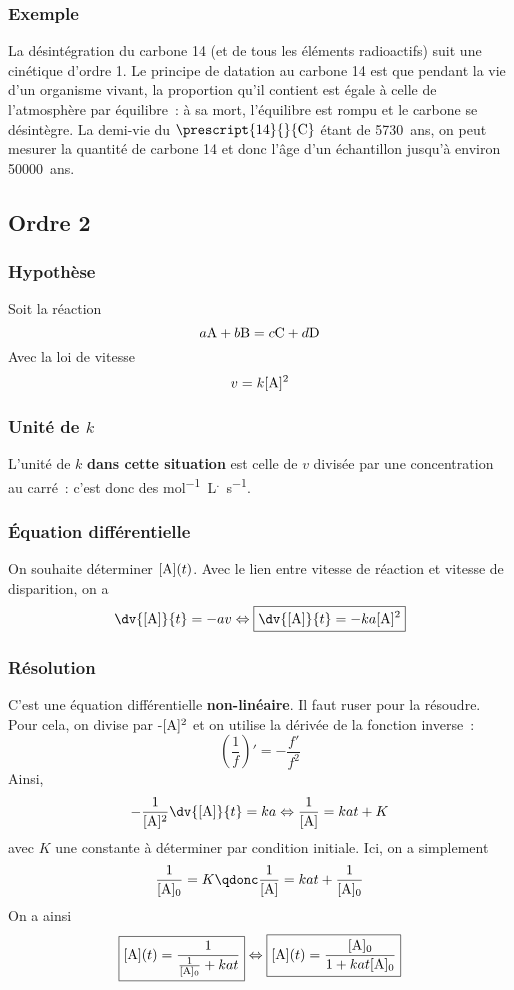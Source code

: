 \documentclass[../main/main.tex]{subfiles}
\begin{document}
\subsubsection{Exemple}
La désintégration du carbone 14 (et de tous les éléments radioactifs) suit une
cinétique d'ordre 1. Le principe de datation au carbone 14 est que pendant la
vie d'un organisme vivant, la proportion qu'il contient est égale à celle de
l'atmosphère par équilibre~: à sa mort, l'équilibre est rompu et le carbone se
désintègre. La demi-vie du $\prescript{14}{}{\mathrm{C}}$ étant de
\SI{5730}{ans}, on peut mesurer la quantité de carbone 14 et donc l'âge d'un
échantillon jusqu'à environ \SI{50000}{ans}.

\subsection{Ordre 2}

\subsubsection{Hypothèse}
Soit la réaction
\[a{\rm A} + b{\rm B}
        =
  c{\rm C} +d{\rm D}
\]
Avec la loi de vitesse
\[v = k [{\rm A}]^2\]

\subsubsection{Unité de $k$}

L'unité de $k$ \textbf{dans cette situation} est celle de $v$ divisée par une
concentration au carré~: c'est donc des \si{mol^{-1}.L^.s^{-1}}.

\subsubsection{Équation différentielle}
On souhaite déterminer $[{\rm A}](t)$. Avec le lien entre vitesse de réaction et
vitesse de disparition, on a
\[ \dv{[{\rm A}]}{t} = -av
\Leftrightarrow
\boxed{\dv{[{\rm A}]}{t} = -ka[{\rm A}]^2}\]

\subsubsection{Résolution}
C'est une équation différentielle \textbf{non-linéaire}. Il faut ruser pour la
résoudre. Pour cela, on divise par -$[{\rm A}]^2$ et on utilise la dérivée de la
fonction inverse~:
\[\left( \frac{1}{f} \right)' = - \frac{f'}{f^2}\]
Ainsi,
\begin{gather*}
    - \frac{1}{[{\rm A}]^2} \dv{[{\rm A}]}{t} = ka
    \Leftrightarrow
    \frac{1}{[{\rm A}]} = kat + K
\end{gather*}
avec $K$ une constante à déterminer par condition initiale. Ici, on a simplement
\[\frac{1}{[{\rm A}]_0} = K
    \qdonc
    \frac{1}{[{\rm A}]} = kat + \frac{1}{[{\rm A}]_0}\]
On a ainsi
\[\boxed{[{\rm A}](t) = \frac{1}{\frac{1}{[{\rm A}]_0} + kat}}
\Leftrightarrow
\boxed{[{\rm A}](t) = \frac{[{\rm A}]_0}{1 + kat[{\rm A}]_0}}\]
\end{document}
